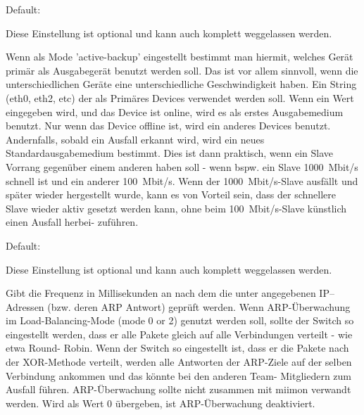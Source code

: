 \begin{description}

  Default: 

  Diese Einstellung ist optional und kann auch komplett weggelassen
  werden.

  Wenn als Mode 'active-backup' eingestellt bestimmt man hiermit,
  welches Gerät primär als Ausgabegerät benutzt werden soll. Das ist
  vor allem sinnvoll, wenn die unterschiedlichen Geräte eine
  unterschiedliche Geschwindigkeit haben. Ein String (eth0, eth2, etc)
  der als Primäres Devices verwendet werden soll. Wenn ein Wert
  eingegeben wird, und das Device ist online, wird es als erstes
  Ausgabemedium benutzt. Nur wenn das Device offline ist, wird ein
  anderes Devices benutzt. Andernfalls, sobald ein Ausfall erkannt
  wird, wird ein neues Standardausgabemedium bestimmt. Dies ist dann
  praktisch, wenn ein Slave Vorrang gegenüber einem anderen haben soll
  - wenn bspw. ein Slave 1000~Mbit/s schnell ist und ein anderer 100~Mbit/s.
  Wenn der 1000~Mbit/s-Slave ausfällt und später wieder hergestellt
  wurde, kann es von Vorteil sein, dass der schnellere Slave wieder
  aktiv gesetzt werden kann, ohne beim 100~Mbit/s-Slave künstlich einen
  Ausfall herbei- zuführen.



  Default: 

  Diese Einstellung ist optional und kann auch komplett weggelassen
  werden.

  Gibt die Frequenz in Millisekunden an nach dem die unter
   angegebenen IP--Adressen
  (bzw. deren ARP Antwort) geprüft werden. Wenn ARP-Überwachung im
  Load-Balancing-Mode (mode 0 or 2) genutzt werden soll, sollte der
  Switch so eingestellt werden, dass er alle Pakete gleich auf alle
  Verbindungen verteilt - wie etwa Round- Robin. Wenn der Switch so
  eingestellt ist, dass er die Pakete nach der XOR-Methode verteilt,
  werden alle Antworten der ARP-Ziele auf der selben Verbindung
  ankommen und das könnte bei den anderen Team- Mitgliedern zum
  Ausfall führen. ARP-Überwachung sollte nicht zusammen mit miimon
  verwandt werden. Wird als Wert 0 übergeben, ist ARP-Überwachung
  deaktiviert.



\end{description}

